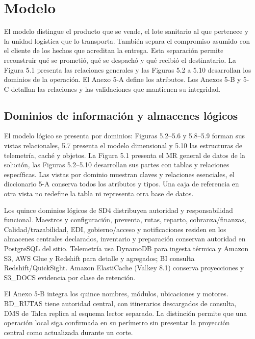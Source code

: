 \section{Modelo}
\label{sec:sd5-5-1}

El modelo distingue el producto que se vende, el lote sanitario al que pertenece y la unidad logística que lo transporta. También separa el compromiso asumido con el cliente de los hechos que acreditan la entrega. Esta separación permite reconstruir qué se prometió, qué se despachó y qué recibió el destinatario. La Figura 5.1 presenta las relaciones generales y las Figuras 5.2 a 5.10 desarrollan los dominios de la operación. El Anexo 5-A define los atributos. Los Anexos 5-B y 5-C detallan las relaciones y las validaciones que mantienen su integridad.

\subsection{Dominios de información y almacenes lógicos}
\label{sec:sd5-5-1-1}

El modelo lógico se presenta por dominios: Figuras 5.2–5.6 y 5.8–5.9 forman sus vistas relacionales, 5.7 presenta el modelo dimensional y 5.10 las estructuras de telemetría, caché y objetos. La Figura 5.1 presenta el MR general de datos de la solución, las Figuras 5.2–5.10 desarrollan sus partes con tablas y relaciones específicas. Las vistas por dominio muestran claves y relaciones esenciales, el diccionario 5-A conserva todos los atributos y tipos. Una caja de referencia en otra vista no redefine la tabla ni representa otra base de datos.

Los quince dominios lógicos de SD4 distribuyen autoridad y responsabilidad funcional. Maestros y configuración, preventa, rutas, reparto, cobranza/finanzas, Calidad/trazabilidad, EDI, gobierno/acceso y notificaciones residen en los almacenes centrales declarados, inventario y preparación conservan autoridad en PostgreSQL del sitio. Telemetría usa DynamoDB para ingesta térmica y Amazon S3, AWS Glue y Redshift para detalle y agregados; BI consulta Redshift/QuickSight. Amazon ElastiCache (Valkey 8.1) conserva proyecciones y S3\_DOCS evidencia por clase de retención.

El Anexo 5-B integra los quince nombres, módulos, ubicaciones y motores. BD\_RUTAS tiene autoridad central, con itinerarios descargados de consulta, DMS de Talca replica al esquema lector separado. La distinción permite que una operación local siga confirmada en su perímetro sin presentar la proyección central como actualizada durante un corte.

